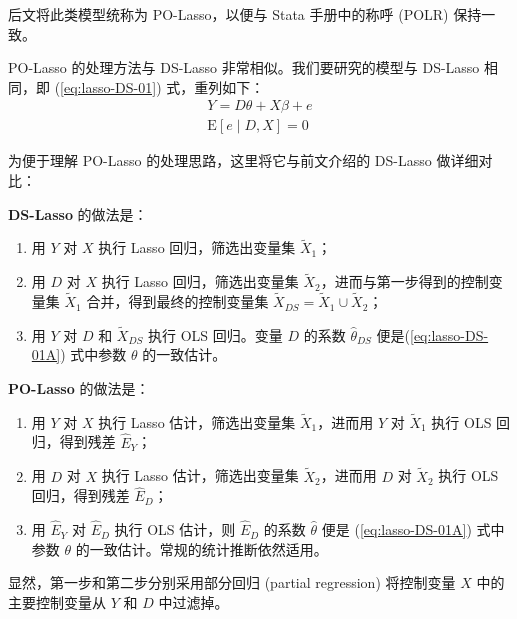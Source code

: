 后文将此类模型统称为 PO-Lasso，以便与 Stata 手册中的称呼 (POLR) 保持一致。 

PO-Lasso 的处理方法与 DS-Lasso 非常相似。我们要研究的模型与 DS-Lasso 相同，即 (\ref{eq:lasso-DS-01}) 式，重列如下：
\begin{equation}\label{eq:lasso-DS-01A}
\begin{aligned}%
Y =D \theta + X \beta + e \\
\mathrm{E}[e \mid D, X] =0
\end{aligned}
\end{equation}

为便于理解 PO-Lasso 的处理思路，这里将它与前文介绍的 DS-Lasso 做详细对比：

\vspace{5pt}
\textbf{DS-Lasso} 的做法是：

\begin{enumerate}
\item 用 $Y$ 对 $X$ 执行 Lasso 回归，筛选出变量集 $\widetilde{X}_1$；
\item 用 $D$ 对 $X$ 执行 Lasso 回归，筛选出变量集 $\widetilde{X}_2$，进而与第一步得到的控制变量集 $\widetilde{X}_1$ 合并，得到最终的控制变量集 $\widetilde{X}_{DS} = \widetilde{X}_1 \cup \widetilde{X}_2$；
\item 用 $Y$ 对 $D$ 和 $\widetilde{X}_{DS}$ 执行 OLS 回归。变量 $D$ 的系数 $\widehat{\theta}_{DS}$ 便是(\ref{eq:lasso-DS-01A}) 式中参数 $\theta$ 的一致估计。
\end{enumerate}

\vspace{5pt}
\textbf{PO-Lasso} 的做法是：\label{page:lasso-polasso}

\begin{enumerate}
\item 用 $Y$ 对 $X$ 执行 Lasso 估计，筛选出变量集 $\widetilde{X}_1$，进而用 $Y$ 对 $\widetilde{X}_1$ 执行 OLS 回归，得到残差 $\widehat{E}_Y$；
\item 用 $D$ 对 $X$ 执行 Lasso 估计，筛选出变量集 $\widetilde{X}_2$，进而用 $D$ 对 $\widetilde{X}_2$ 执行 OLS 回归，得到残差 $\widehat{E}_D$；
\item 用 $\widehat{E}_Y$ 对 $\widehat{E}_D$ 执行 OLS 估计，则 $\widehat{E}_D$ 的系数 $\widehat{\theta}$ 便是 (\ref{eq:lasso-DS-01A}) 式中参数 $\theta$ 的一致估计。常规的统计推断依然适用。
\end{enumerate}

显然，第一步和第二步分别采用部分回归 (partial regression) 将控制变量 $X$ 中的主要控制变量从 $Y$ 和 $D$ 中过滤掉。
 
